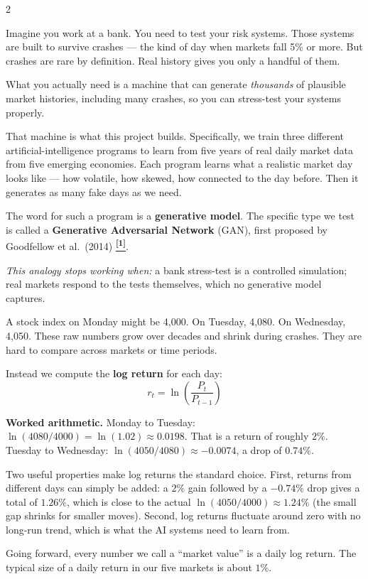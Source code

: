 \documentclass[10pt]{article}
\newcommand{\navybox}[2]{\begin{tcolorbox}[mybox={Navy}{LBg},title={#1}]#2\end{tcolorbox}}
\newcommand{\tcite}[1]{%
  \hyperlink{R:#1}{\textsuperscript{\scriptsize\textbf{[#1]}}}}
\begin{document}
\begin{multicols}{2}

\navybox{1\quad What We Are Trying to Build}{%
Imagine you work at a bank. You need to test your risk systems. Those systems are built to survive crashes --- the kind of day when markets fall 5\% or more. But crashes are rare by definition. Real history gives you only a handful of them.

What you actually need is a machine that can generate \emph{thousands} of plausible market histories, including many crashes, so you can stress-test your systems properly.

That machine is what this project builds. Specifically, we train three different artificial-intelligence programs to learn from five years of real daily market data from five emerging economies. Each program learns what a realistic market day looks like --- how volatile, how skewed, how connected to the day before. Then it generates as many fake days as we need.

The word for such a program is a \textbf{generative model}. The specific type we test is called a \textbf{Generative Adversarial Network} (GAN), first proposed by Goodfellow et al.\ (2014)\tcite{1}.

\smallskip
\textit{This analogy stops working when:} a bank stress-test is a controlled simulation; real markets respond to the tests themselves, which no generative model captures.}

\columnbreak

\navybox{2\quad Prices, and Why We Study Changes}{%
A stock index on Monday might be 4{,}000. On Tuesday, 4{,}080. On Wednesday, 4{,}050. These raw numbers grow over decades and shrink during crashes. They are hard to compare across markets or time periods.

Instead we compute the \textbf{log return} for each day:
\begin{equation*}
  r_t = \ln\!\left(\frac{P_t}{P_{t-1}}\right)
\end{equation*}

\textbf{Worked arithmetic.} Monday to Tuesday: $\ln(4080/4000) = \ln(1.02) \approx 0.0198$. That is a return of roughly $2\%$. Tuesday to Wednesday: $\ln(4050/4080) \approx -0.0074$, a drop of $0.74\%$.

Two useful properties make log returns the standard choice.
First, returns from different days can simply be added: a $2\%$ gain followed by a $-0.74\%$ drop gives a total of $1.26\%$, which is close to the actual $\ln(4050/4000) \approx 1.24\%$ (the small gap shrinks for smaller moves).
Second, log returns fluctuate around zero with no long-run trend, which is what the AI systems need to learn from.

\smallskip
Going forward, every number we call a ``market value'' is a daily log return. The typical size of a daily return in our five markets is about $1\%$.}

\end{multicols}
\end{document}
